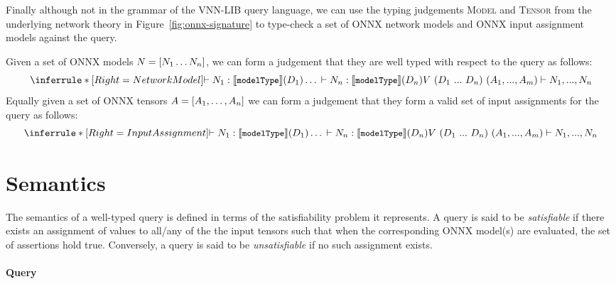 Finally although not in the grammar of the VNN-LIB query language, we can use the typing judgements \textsc{Model} and \textsc{Tensor} from the underlying network theory in Figure~\ref{fig:onnx-signature} to type-check a set of ONNX network models and ONNX input assignment models against the query.

Given a set of ONNX models $N = [N_1 \ldots N_n]$, we can form a judgement that they are well typed with respect to the query as follows:
\begin{equation*}
\inferrule*[Right=NetworkModel]
{
    \vdash N_1 : \semModelType(D_1) \\ \ldots \\ \vdash N_n : \semModelType(D_n)
}
{
    V~(D_1~...~D_n)~(A_1,...,A_m) \vdash N_1, ..., N_n
}
\end{equation*}
Equally given a set of ONNX tensors $A = [A_1, \ldots, A_n]$ we can form a judgement that they form a valid set of input assignments for the query as follows:
\begin{equation*}
\inferrule*[Right=InputAssignment]
{
    \vdash N_1 : \semModelType(D_1) \\ \ldots \\ \vdash N_n : \semModelType(D_n)
}
{
    V~(D_1~...~D_n)~(A_1,...,A_m) \vdash N_1, ..., N_n
}
\end{equation*}

\section{Semantics}
\label{sec:semantics}


The semantics of a well-typed \vnnlib{} query is defined in terms of the satisfiability problem it represents. A query is said to be \textit{satisfiable} if there exists an assignment of values to all/any of the the input tensors such that when the corresponding ONNX model(s) are evaluated, the set of assertions hold true. Conversely, a query is said to be \textit{unsatisfiable} if no such assignment exists.


\paragraph{Query}

